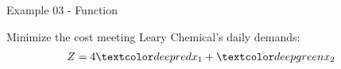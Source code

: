 \begin{frame}{Example 03 - Function}

Minimize the cost meeting Leary Chemical's daily demands:
\Huge{
\begin{align*}
    Z &= 4\colora{x_1} + \colorb{x_2}
\end{align*}
}

\end{frame}
